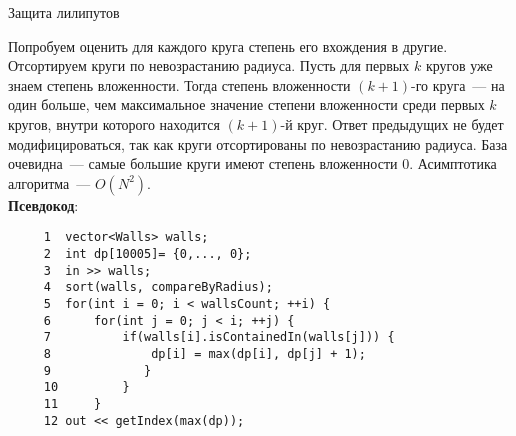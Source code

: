 \begin{tutorial}{Защита лилипутов}

Попробуем оценить для каждого круга степень его вхождения в другие. Отсортируем круги по невозрастанию радиуса. Пусть для первых $k$ кругов уже знаем степень вложенности. Тогда степень вложенности $(k+1)$-го круга~--- на один больше, чем максимальное значение степени вложенности среди первых $k$ кругов, внутри которого находится $(k+1)$-й круг. Ответ предыдущих не будет модифицироваться, так как круги отсортированы по невозрастанию радиуса. База очевидна~--- самые большие круги имеют степень вложенности $0$. Асимптотика алгоритма~--- ${O}(N^2)$.
\newline
\\
\textbf{Псевдокод}:
\begin{verbatim}
     1  vector<Walls> walls;
     2  int dp[10005]= {0,..., 0};
     3  in >> walls;
     4  sort(walls, compareByRadius);
     5  for(int i = 0; i < wallsCount; ++i) {
     6      for(int j = 0; j < i; ++j) {
     7          if(walls[i].isContainedIn(walls[j])) {
     8              dp[i] = max(dp[i], dp[j] + 1);
     9             }
     10         }
     11     }
     12 out << getIndex(max(dp));
\end{verbatim}


\end{tutorial}
